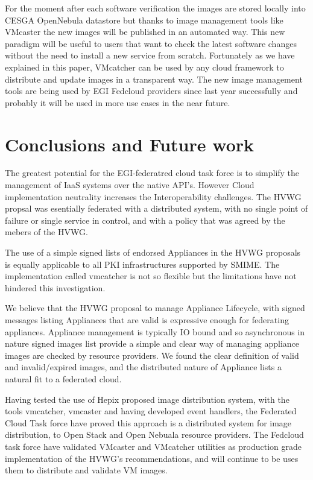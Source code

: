 \documentclass{llncs_Ibergrid2013}
\begin{document}
For the moment after each software verification the images are stored locally into CESGA OpenNebula datastore but thanks to image management tools like VMcaster the new images will be published in an automated way.
This new paradigm will be useful to users that want to check the latest software changes without the need to install a new service from scratch.
Fortunately as we have explained in this paper, VMcatcher can be used by any cloud framework to distribute and update images in a transparent way. 
The new image management tools are being used by EGI Fedcloud providers since last year successfully and probably it will be used in more use cases in the near future.

\section{Conclusions and Future work}
\label{sect-conclusions}
The greatest potential for the EGI-federatred cloud task force is to simplify the management of IaaS systems over the native API's. However Cloud implementation neutrality increases the Interoperability challenges. 
The HVWG propsal was esentially federated with a distributed system, with no single point of failure or single service in control, and with a policy that was agreed by the mebers of the HVWG.

The use of a simple signed lists of endorsed Appliances in the HVWG proposals is equally applicable to all PKI infrastructures supported by SMIME. The implementation called vmcatcher is not so flexible but the limitations have not hindered this investigation.

We believe that the HVWG proposal to manage Appliance Lifecycle, with signed messages listing Appliances that are valid is expressive enough for federating appliances. Appliance management is typically IO bound and so asynchronous in nature signed images list provide a simple and clear way of managing appliance images are checked by resource providers. We found the clear definition of valid and invalid/expired images, and the distributed nature of Appliance lists a natural fit to a federated cloud.

Having tested the use of Hepix proposed image distribution system, with the tools vmcatcher, vmcaster and having developed event handlers, the Federated Cloud Task force have proved this approach is a distributed system for image distribution, to Open Stack and Open Nebuala resource providers. The Fedcloud task force have validated VMcaster and VMcatcher utilities as production grade implementation of the HVWG's recommendations, and will continue to be uses them to distribute and validate VM images.
\end{document}
